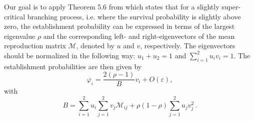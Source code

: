\documentclass[11pt]{article}
\newcommand{\chg}[1]{\textcolor{change}{#1}}
\begin{document}
Our goal is to apply Theorem 5.6 from \citet{haccou_book} which states that for a slightly super-critical branching process, \chg{i.e. where the survival probability is slightly above zero}, the establishment probability can be expressed in terms of the largest eigenvalue $\rho$ and the corresponding left- and right-eigenvectors of the mean reproduction matrix \chg{$\mathcal{M}$}, denoted by $u$ and $v$, respectively. The eigenvectors should be normalized in the following way: $u_1+u_2 = 1$ and $\sum_{i=1}^2 u_i v_i = 1$. The establishment probabilities are then given by 
\begin{equation}\label{Seq:theory}
\varphi_i = \frac{2(\rho-1)}{B} v_i + O(\varepsilon), 
\end{equation}
with
\begin{equation} 
B = \sum_{i=1}^2 u_i \sum_{j=1}^2 v_j \mathcal{M}_{ij} + \rho(1-\rho) \sum_{j=1}^2 u_j v_j^2\, . 
\end{equation} 
\end{document}
